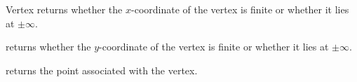 \begin{ccRefClass}{Vertex}
    {returns whether the $x$-coordinate of the vertex is finite or whether
     it lies at $\pm\infty$.}

    {returns whether the $y$-coordinate of the vertex is finite or whether
     it lies at $\pm\infty$.}

    {returns the point associated with the vertex.
     }

\end{ccRefClass}

\ccRefPageEnd
